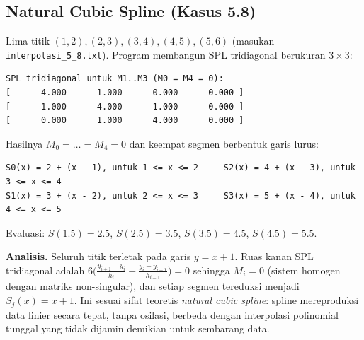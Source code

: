 \documentclass[12pt,a4paper]{article}
\begin{document}
\subsection{Natural Cubic Spline (Kasus 5.8)}
Lima titik $(1,2),(2,3),(3,4),(4,5),(5,6)$ (masukan \texttt{interpolasi\_5\_8.txt}). Program membangun SPL tridiagonal berukuran $3\times3$:
\begin{lstlisting}
SPL tridiagonal untuk M1..M3 (M0 = M4 = 0):
[      4.000      1.000      0.000      0.000 ]
[      1.000      4.000      1.000      0.000 ]
[      0.000      1.000      4.000      0.000 ]
\end{lstlisting}
Hasilnya $M_0=\dots=M_4=0$ dan keempat segmen berbentuk garis lurus:
\begin{lstlisting}
S0(x) = 2 + (x - 1), untuk 1 <= x <= 2     S2(x) = 4 + (x - 3), untuk 3 <= x <= 4
S1(x) = 3 + (x - 2), untuk 2 <= x <= 3     S3(x) = 5 + (x - 4), untuk 4 <= x <= 5
\end{lstlisting}
Evaluasi: $S(1.5)=2.5$, $S(2.5)=3.5$, $S(3.5)=4.5$, $S(4.5)=5.5$.

\textbf{Analisis.} Seluruh titik terletak pada garis $y=x+1$. Ruas kanan SPL tridiagonal adalah $6\bigl(\tfrac{y_{i+1}-y_i}{h_i}-\tfrac{y_i-y_{i-1}}{h_{i-1}}\bigr)=0$ sehingga $M_i=0$ (sistem homogen dengan matriks non-singular), dan setiap segmen tereduksi menjadi $S_j(x)=x+1$. Ini sesuai sifat teoretis \textit{natural cubic spline}: spline mereproduksi data linier secara tepat, tanpa osilasi, berbeda dengan interpolasi polinomial tunggal yang tidak dijamin demikian untuk sembarang data.
\end{document}
